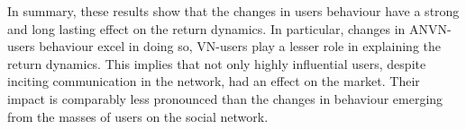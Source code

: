 
In summary, these results show that the changes in users behaviour have a strong and long lasting effect on the return dynamics. In particular, changes in ANVN-users behaviour excel in doing so, VN-users play a lesser role in explaining the return dynamics. This implies that not only highly influential users, despite inciting communication in the network, had an effect on the market. Their impact is comparably less pronounced than the changes in behaviour emerging from the masses of users on the social network. 


